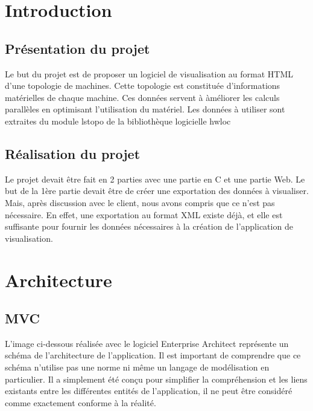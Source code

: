 \documentclass [a4paper,11pt]{article}
\begin{document}
\tableofcontents

\newpage

\section{Introduction}

\subsection{Présentation du projet}
Le but du projet est de proposer un logiciel de visualisation au format HTML d'une topologie de machines. Cette topologie est constituée d'informations matérielles de chaque machine. Ces données servent à àméliorer les calculs parallèles en optimisant l'utilisation du matériel. Les données à utiliser sont extraites du module lstopo de la bibliothèque logicielle hwloc

\subsection{Réalisation du projet}
Le projet devait être fait en 2 parties avec une partie en C et une partie Web. Le but de la 1ère partie devait être de créer une exportation des données à visualiser. Mais, après discussion avec le client, nous avons compris que ce n'est pas nécessaire. En effet, une exportation au format XML existe déjà, et elle est suffisante pour fournir les données nécessaires à la création de l'application de visualisation.

\newpage
\section{Architecture}

\subsection{MVC}
L’image ci-dessous réalisée avec le logiciel Enterprise Architect représente un schéma de l’architecture de l’application. Il est important de comprendre que ce schéma n’utilise pas une norme ni même un langage de modélisation en particulier. Il a simplement été conçu pour simplifier la compréhension et les liens existants entre les différentes entités de l’application, il ne peut être considéré comme exactement conforme à la réalité.
\newline
\end{document}
